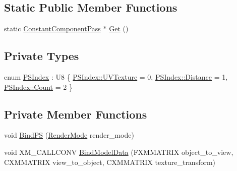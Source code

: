 \subsection*{Static Public Member Functions}
\begin{DoxyCompactItemize}
\item 
static \hyperlink{classmage_1_1_constant_component_pass}{Constant\+Component\+Pass} $\ast$ \hyperlink{classmage_1_1_constant_component_pass_ae8c8c69c9e69c4324e390833c2e3653b}{Get} ()
\end{DoxyCompactItemize}
\subsection*{Private Types}
\begin{DoxyCompactItemize}
\item 
enum \hyperlink{classmage_1_1_constant_component_pass_abad8858867cb29081767f13ba6cdb366}{P\+S\+Index} \+: U8 \{ \hyperlink{classmage_1_1_constant_component_pass_abad8858867cb29081767f13ba6cdb366a73dca3b76eca77b89c050588adba1c2b}{P\+S\+Index\+::\+U\+V\+Texture} = 0, 
\hyperlink{classmage_1_1_constant_component_pass_abad8858867cb29081767f13ba6cdb366a0aa6f4210bf373c95eda00232e93cd98}{P\+S\+Index\+::\+Distance} = 1, 
\hyperlink{classmage_1_1_constant_component_pass_abad8858867cb29081767f13ba6cdb366ae93f994f01c537c4e2f7d8528c3eb5e9}{P\+S\+Index\+::\+Count} = 2
 \}
\end{DoxyCompactItemize}
\subsection*{Private Member Functions}
\begin{DoxyCompactItemize}
\item 
void \hyperlink{classmage_1_1_constant_component_pass_a6027d0f628ffd03618aebacb35672c6e}{Bind\+PS} (\hyperlink{namespacemage_a9d24b35ed0bdecf8535e2b91fe0eebba}{Render\+Mode} render\+\_\+mode)
\item 
void X\+M\+\_\+\+C\+A\+L\+L\+C\+O\+NV \hyperlink{classmage_1_1_constant_component_pass_a196372d184f74c8f268adc1e7865ef17}{Bind\+Model\+Data} (F\+X\+M\+M\+A\+T\+R\+IX object\+\_\+to\+\_\+view, C\+X\+M\+M\+A\+T\+R\+IX view\+\_\+to\+\_\+object, C\+X\+M\+M\+A\+T\+R\+IX texture\+\_\+transform)
\end{DoxyCompactItemize}
